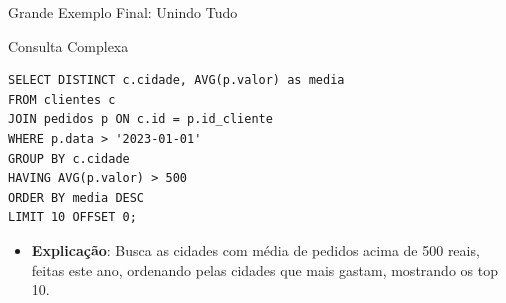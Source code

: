 \documentclass[9pt]{beamer}
\begin{document}
\begin{frame}[fragile]{Grande Exemplo Final: Unindo Tudo}
  \begin{exampleblock}{Consulta Complexa}
\begin{lstlisting}
SELECT DISTINCT c.cidade, AVG(p.valor) as media
FROM clientes c
JOIN pedidos p ON c.id = p.id_cliente
WHERE p.data > '2023-01-01'
GROUP BY c.cidade
HAVING AVG(p.valor) > 500
ORDER BY media DESC
LIMIT 10 OFFSET 0;
\end{lstlisting}
  \end{exampleblock}
  \vspace{0.2cm}
  \begin{itemize}
    \item \textbf{Explicação}: Busca as cidades com média de pedidos acima de 500 reais, feitas este ano, ordenando pelas cidades que mais gastam, mostrando os top 10.
  \end{itemize}
\end{frame}
\end{document}
